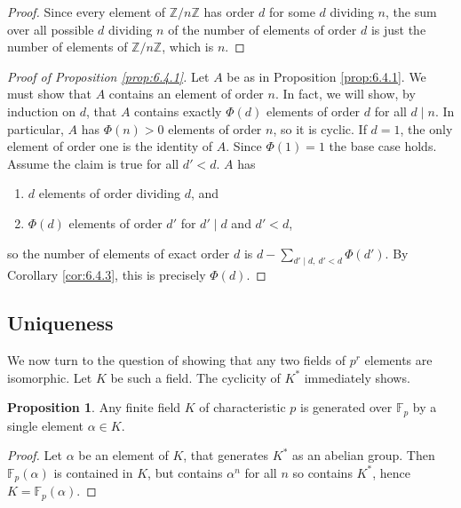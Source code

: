 \documentclass{article}
\newcommand{\F}{\mathbb{F}}
\newcommand{\Z}{\mathbb{Z}}
\newcommand{\rb}[1]{\left( #1 \right)}
\theoremstyle{definition}\newtheorem{definition}{Definition}[subsection]
\theoremstyle{definition}\newtheorem{remark}[definition]{Remark}
\theoremstyle{definition}\newtheorem*{example}{Example}
\theoremstyle{definition}\newtheorem*{note}{Note}
\newtheorem{proposition}[definition]{Proposition}
\begin{document}
\begin{proof}
Since every element of $ \Z / n\Z $ has order $ d $ for some $ d $ dividing $ n $, the sum over all possible $ d $ dividing $ n $ of the number of elements of order $ d $ is just the number of elements of $ \Z / n\Z $, which is $ n $.
\end{proof}

\begin{proof}[Proof of Proposition \ref{prop:6.4.1}]
Let $ A $ be as in Proposition \ref{prop:6.4.1}. We must show that $ A $ contains an element of order $ n $. In fact, we will show, by induction on $ d $, that $ A $ contains exactly $ \Phi\rb{d} $ elements of order $ d $ for all $ d \mid n $. In particular, $ A $ has $ \Phi\rb{n} > 0 $ elements of order $ n $, so it is cyclic. If $ d = 1 $, the only element of order one is the identity of $ A $. Since $ \Phi\rb{1} = 1 $ the base case holds. Assume the claim is true for all $ d' < d $. $ A $ has
\begin{enumerate}
\item $ d $ elements of order dividing $ d $, and
\item $ \Phi\rb{d} $ elements of order $ d' $ for $ d' \mid d $ and $ d' < d $,
\end{enumerate}
so the number of elements of exact order $ d $ is $ d - \sum_{d' \mid d, \ d' < d} \Phi\rb{d'} $. By Corollary \ref{cor:6.4.3}, this is precisely $ \Phi\rb{d} $.
\end{proof}

\subsection{Uniqueness}

We now turn to the question of showing that any two fields of $ p^r $ elements are isomorphic. Let $ K $ be such a field. The cyclicity of $ K^* $ immediately shows.

\begin{proposition}
Any finite field $ K $ of characteristic $ p $ is generated over $ \F_p $ by a single element $ \alpha \in K $.
\end{proposition}

\begin{proof}
Let $ \alpha $ be an element of $ K $, that generates $ K^* $ as an abelian group. Then $ \F_p\rb{\alpha} $ is contained in $ K $, but contains $ \alpha^n $ for all $ n $ so contains $ K^* $, hence $ K = \F_p\rb{\alpha} $.
\end{proof}
\end{document}
